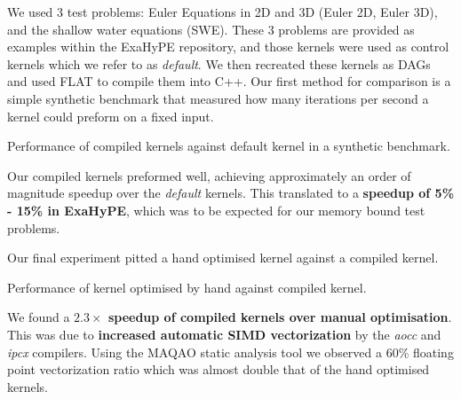 We used 3 test problems: Euler Equations in 2D and 3D (Euler 2D, Euler 3D), and the shallow water equations (SWE).
These 3 problems are provided as examples within the ExaHyPE repository, and those kernels were used as control kernels which we refer to as \textit{default}.
We then recreated these kernels as DAGs and used FLAT to compile them into C++.
Our first method for comparison is a simple synthetic benchmark that measured how many iterations per second a kernel could preform on a fixed input.  

\begin{table}
    \centering
     
    \caption{Performance of compiled kernels against default kernel in a synthetic benchmark.} 
\end{table}

Our compiled kernels preformed well, achieving approximately an order of magnitude speedup over the \textit{default} kernels.
This translated to a \textbf{speedup of 5\% - 15\% in ExaHyPE}, which was to be expected for our memory bound test problems.
% 

Our final experiment pitted a hand optimised kernel against a compiled kernel. 
\begin{table}
    \centering
     
    \caption{Performance of kernel optimised by hand against compiled kernel.}
\end{table}

We found a \textbf{$2.3\times$ speedup of compiled kernels over manual optimisation}.
This was due to \textbf{increased automatic SIMD vectorization} by the \textit{aocc} and \textit{ipcx} compilers.
Using the MAQAO static analysis tool we observed a 60\% floating point vectorization ratio which was almost double that of the hand optimised kernels.
